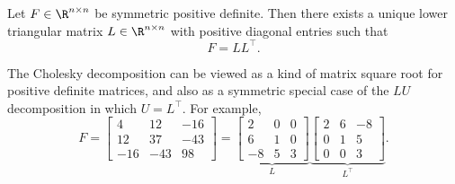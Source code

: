 \begin{definition}
    Let $F \in \R^{n \times n}$ be symmetric positive definite. Then there exists a unique lower triangular matrix $L \in \R^{n \times n}$ with positive diagonal entries such that
    \begin{equation*}
        F = LL^\top.
    \end{equation*}
\end{definition}
The Cholesky decomposition can be viewed as a kind of matrix square root for positive definite matrices, and also as a symmetric special case of the $LU$ decomposition in which $U = L^\top$. For example,
\begin{equation*}
    F = \begin{bmatrix}
        4 & 12 & -16 \\
        12 & 37 & -43 \\
        -16 & -43 & 98
    \end{bmatrix}
    =
    \underbrace{\begin{bmatrix}
        2 & 0 & 0 \\
        6 & 1 & 0 \\
        -8 & 5 & 3
    \end{bmatrix}}_{L}
    \underbrace{\begin{bmatrix}
        2 & 6 & -8 \\
        0 & 1 & 5 \\
        0 & 0 & 3
    \end{bmatrix}}_{L^\top}.
\end{equation*}

